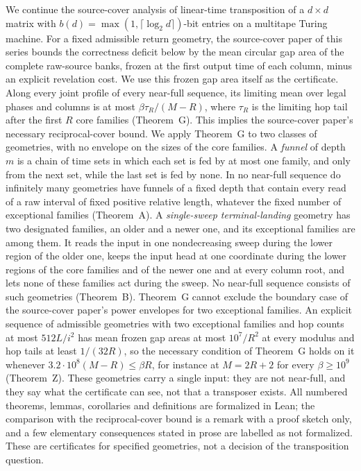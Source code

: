 We continue the source-cover analysis of linear-time transposition of a $d\times d$
matrix with $b(d)=\max(1,\lceil\log_2d\rceil)$-bit entries on a multitape Turing
machine. For a fixed admissible return geometry, the source-cover paper of this series
bounds the correctness deficit below by the mean circular gap area of the complete
raw-source banks, frozen at the first output time of each column, minus an explicit
revelation cost. We use this frozen gap area itself as the certificate. Along every
joint profile of every near-full sequence, its limiting mean over legal phases and
columns is at most $\beta\tau_R/(M-R)$, where $\tau_R$ is the limiting hop tail after
the first $R$ core families (Theorem~G). This implies the source-cover paper's
necessary reciprocal-cover bound. We apply Theorem~G to two classes of geometries, with
no envelope on the sizes of the core families.
A \emph{funnel} of depth $m$ is a chain of time sets in which each set is fed by at
most one family, and only from the next set, while the last set is fed by none. In no
near-full sequence do infinitely many geometries have funnels of a fixed depth that contain
every read of a raw interval of fixed positive relative length, whatever the fixed number of
exceptional families (Theorem~A). A \emph{single-sweep terminal-landing} geometry has two
designated families, an older and a newer one, and its exceptional families are among
them. It reads the input in one nondecreasing sweep during the lower region of the older
one, keeps the input head at one coordinate during the lower regions of the core families
and of the newer one and at every column root, and lets none of these families act during
the sweep. No near-full sequence consists of such geometries (Theorem~B). Theorem~G cannot
exclude the boundary case of the source-cover paper's power envelopes for two exceptional
families. An explicit sequence of admissible geometries with two exceptional families and
hop counts at most $512L/i^2$ has mean frozen gap areas at most $10^7/R^2$ at every
modulus and hop tails at least $1/(32R)$, so the necessary condition of Theorem~G holds on
it whenever $3.2\cdot10^8(M-R)\le\beta R$, for instance at $M=2R+2$ for every
$\beta\ge10^9$ (Theorem~Z). These geometries carry a single input: they are not near-full,
and they say what the certificate can see, not that a transposer exists. All numbered
theorems, lemmas, corollaries and definitions are formalized in Lean; the comparison with
the reciprocal-cover bound is a remark with a proof sketch only, and a few elementary
consequences stated in prose are labelled as not formalized. These are certificates for
specified geometries, not a decision of the transposition question.
